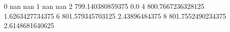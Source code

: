0 nan nan
1 nan nan
2 799.140380859375 0.0
4 800.7667236328125 1.6263427734375
6 801.579345703125 2.43896484375
8 801.7552490234375 2.6148681640625
